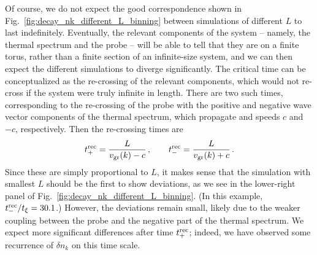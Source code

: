 \documentclass[aps,prd,notitlepage,amsfonts,amssymb,amsmath,nofootinbib,superscriptaddress,longbibliography]{revtex4-2}
\begin{document}
\begin{appendices}
Of course, we do not expect the good correspondence shown in Fig.~\ref{fig:decay_nk_different_L_binning} between simulations of different $L$ to last indefinitely.  Eventually, the relevant components of the system -- namely, the thermal spectrum and the probe -- will be able to tell that they are on a finite torus, rather than a finite section of an infinite-size system, and we can then expect the different simulations to diverge significantly.  The critical time can be conceptualized as the re-crossing of the relevant components, which would not re-cross if the system were truly infinite in length.  There are two such times, corresponding to the re-crossing of the probe with the positive and negative wave vector components of the thermal spectrum, which propagate and speeds $c$ and $-c$, respectively.  Then the re-crossing times are
\begin{equation}
    t_{+}^{\rm rec} = \frac{L}{v_{\rm gr}(k)-c} \,, \qquad t_{-}^{\rm rec} = \frac{L}{v_{\rm gr}(k)+c} \,.
\end{equation}
Since these are simply proportional to $L$, it makes sense that the simulation with smallest $L$ should be the first to show deviations, as we see in the lower-right panel of Fig.~\ref{fig:decay_nk_different_L_binning}.  (In this example, $t_{-}^{\rm rec}/t_{\xi} = 30.1$.)  However, the deviations remain small, likely due to the weaker coupling between the probe and the negative part of the thermal spectrum.  We expect more significant differences after time $t_{+}^{\rm rec}$; indeed, we have observed some recurrence of $\delta n_{k}$ on this time scale.








\end{appendices}
\end{document}
